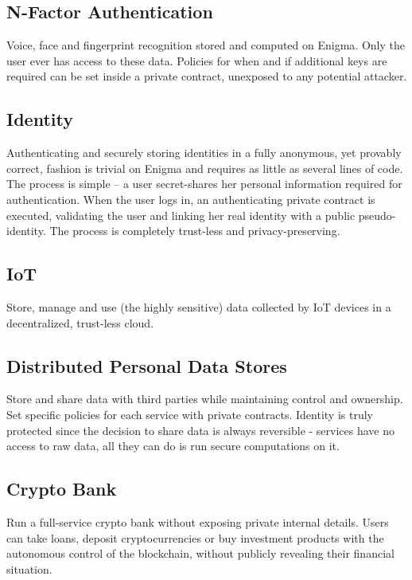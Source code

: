 \documentclass{article} \usepackage{nips13submit_e,times}
\begin{document}
\subsection{N-Factor Authentication}

Voice, face and fingerprint recognition stored and computed on Enigma. Only the user ever has access to these data. Policies for when and if additional keys are required can be set inside a private contract, unexposed to any potential attacker.

\subsection{Identity}

Authenticating and securely storing identities in a fully anonymous, yet provably correct, fashion is trivial on Enigma and requires as little as several lines of code. The process is simple -- a user secret-shares her personal information required for authentication. When the user logs in, an authenticating private contract is executed, validating the user and linking her real identity with a public pseudo-identity. The process is completely trust-less and privacy-preserving.

\subsection{IoT}

Store, manage and use (the highly sensitive) data collected by IoT devices in a decentralized, trust-less cloud.




\subsection{Distributed Personal Data Stores}

Store and share data with third parties while maintaining control and ownership. Set specific policies for each service with private contracts. Identity is truly protected since the decision to share data is always reversible - services have no access to raw data, all they can do is run secure computations on it. 

\subsection{Crypto Bank}

Run a full-service crypto bank without exposing private internal details. Users can take loans, deposit cryptocurrencies or buy investment products with the autonomous control of the blockchain, without publicly revealing their financial situation.
\end{document}
